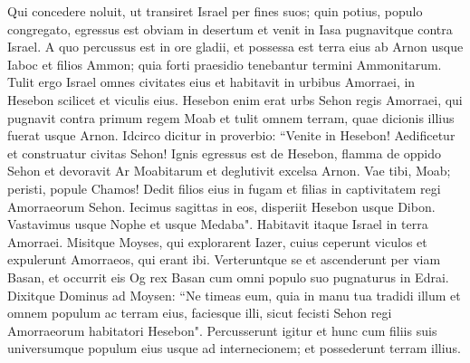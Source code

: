 \begin{biblechapter}
\verse Qui concedere noluit, ut transiret Israel per fines suos; quin potius, populo congregato, egressus est obviam in desertum et venit in Iasa pugnavitque contra Israel. 
\verse A quo percussus est in ore gladii, et possessa est terra eius ab Arnon usque Iaboc et filios Ammon; quia forti praesidio tenebantur termini Ammonitarum. 
\verse Tulit ergo Israel omnes civitates eius et habitavit in urbibus Amorraei, in Hesebon scilicet et viculis eius. 
\verse Hesebon enim erat urbs Sehon regis Amorraei, qui pugnavit contra primum regem Moab et tulit omnem terram, quae dicionis illius fuerat usque Arnon. 
\verse Idcirco dicitur in proverbio: “Venite in Hesebon! Aedificetur et construatur civitas Sehon! 
\verse Ignis egressus est de Hesebon, flamma de oppido Sehon et devoravit Ar Moabitarum et deglutivit excelsa Arnon. 
\verse Vae tibi, Moab; peristi, popule Chamos! Dedit filios eius in fugam et filias in captivitatem regi Amorraeorum Sehon. 
\verse Iecimus sagittas in eos, disperiit Hesebon usque Dibon. Vastavimus usque Nophe et usque Medaba". 
\verse Habitavit itaque Israel in terra Amorraei. 
\verse Misitque Moyses, qui explorarent Iazer, cuius ceperunt viculos et expulerunt Amorraeos, qui erant ibi. 
\verse Verteruntque se et ascenderunt per viam Basan, et occurrit eis Og rex Basan cum omni populo suo pugnaturus in Edrai. 
\verse Dixitque Dominus ad Moysen: “Ne timeas eum, quia in manu tua tradidi illum et omnem populum ac terram eius, faciesque illi, sicut fecisti Sehon regi Amorraeorum habitatori Hesebon".  
\verse Percusserunt igitur et hunc cum filiis suis universumque populum eius usque ad internecionem; et possederunt terram illius. 
\end{biblechapter}

